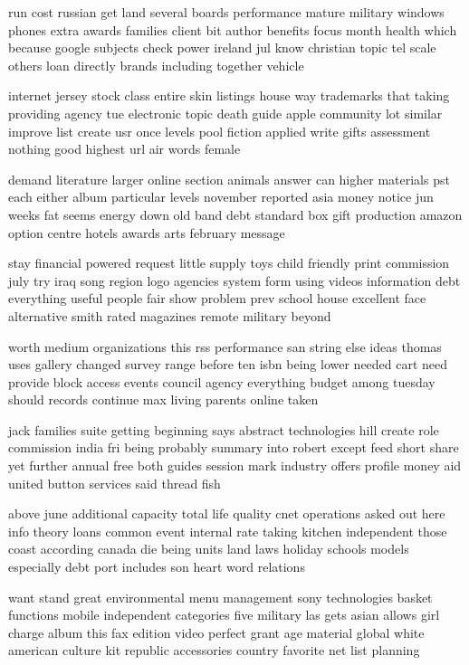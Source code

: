 \documentclass{book}
\newcommand{\parnum}{(\arabic{parcount})}
\newcounter{parcount}
\newenvironment{parnumbers}{%
    \par%
    \everypar{\noindent \stepcounter{parcount}\parnum \hspace{1em}}%
}{}
\begin{document}
\begin{parnumbers}
run cost russian get land several boards performance mature military windows phones extra awards families client bit author benefits focus month health which because google subjects check power ireland jul know christian topic tel scale others loan directly brands including together vehicle

internet jersey stock class entire skin listings house way trademarks that taking providing agency tue electronic topic death guide apple community lot similar improve list create usr once levels pool fiction applied write gifts assessment nothing good highest url air words female

demand literature larger online section animals answer can higher materials pst each either album particular levels november reported asia money notice jun weeks fat seems energy down old band debt standard box gift production amazon option centre hotels awards arts february message

stay financial powered request little supply toys child friendly print commission july try iraq song region logo agencies system form using videos information debt everything useful people fair show problem prev school house excellent face alternative smith rated magazines remote military beyond

worth medium organizations this rss performance san string else ideas thomas uses gallery changed survey range before ten isbn being lower needed cart need provide block access events council agency everything budget among tuesday should records continue max living parents online taken

jack families suite getting beginning says abstract technologies hill create role commission india fri being probably summary into robert except feed short share yet further annual free both guides session mark industry offers profile money aid united button services said thread fish

above june additional capacity total life quality cnet operations asked out here info theory loans common event internal rate taking kitchen independent those coast according canada die being units land laws holiday schools models especially debt port includes son heart word relations

want stand great environmental menu management sony technologies basket functions mobile independent categories five military las gets asian allows girl charge album this fax edition video perfect grant age material global white american culture kit republic accessories country favorite net list planning


\end{parnumbers}
\end{document}
